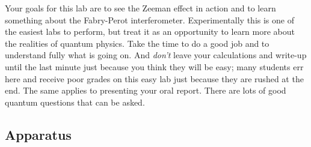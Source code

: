 \documentclass{../lab}
\begin{document}
Your goals for this lab are to see the Zeeman effect in action and to learn something about the Fabry-Perot interferometer. Experimentally this is one of the easiest labs to perform, but treat it as an opportunity to learn more about the realities of quantum physics. Take the time to do a good job and to understand fully what is going on. And \emph{don't} leave your calculations and write-up until the last minute just because you think they will be easy; many students err here and receive poor grades on this easy lab just because they are rushed at the end. The same applies to presenting your oral report. There are lots of good quantum questions that can be asked.

\subsection{Apparatus}
\end{document}
